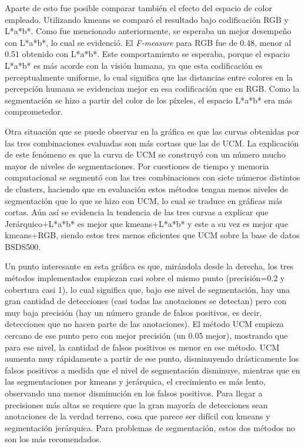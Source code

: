 \documentclass[10pt,twocolumn,letterpaper]{article}
\begin{document}
Aparte de esto fue posible comparar también el efecto del espacio de color empleado. Utilizando kmeans se comparó el resultado bajo codificación RGB y L*a*b*. Como fue mencionado anteriormente, se esperaba un mejor desempeño con L*a*b*, lo cual se evidenció. El \textit{F-measure} para RGB fue de 0.48, menor al 0.51 obtenido con L*a*b*. Este comportamiento se esperaba, porque el espacio L*a*b* es más acorde con la visión humana, ya que esta codificación es perceptualmente uniforme, lo cual significa que las distancias entre colores en la percepción humana se evidencian mejor en esa codificación que en RGB. Como la segmentación se hizo a partir del color de los píxeles, el espacio L*a*b* era más comprometedor.

Otra situación que se puede observar en la gráfica es que las curvas obtenidas por las tres combinaciones evaluadas son más cortass que las de UCM. La explicación de este fenómeno es que la curva de UCM se construyó con un número mucho mayor de niveles de segmentaciones. Por cuestiones de tiempo y memoria computacional se segmentó con las tres combinaciones con siete números distintos de clusters, haciendo que en evaluación estos métodos tengan menos niveles de segmentación que lo que se hizo con UCM, lo cual se traduce en gráficas más cortas. Aún así se evidencia la tendencia de las tres curvas a explicar que Jerárquico+L*a*b* es mejor que kmeans+L*a*b* y este a su vez es mejor que kmeans+RGB, siendo estos tres menos eficientes que UCM sobre la base de datos BSDS500. 

Un punto interesante en esta gráfica es que, mirándola desde la derecha, los tres métodos implementados empiezan casi sobre el mismo punto (precisión=0.2 y cobertura casi 1), lo cual significa que, bajo ese nivel de segmentación, hay una gran cantidad de detecciones (casi todas las anotaciones se detectan) pero con muy baja precisión (hay un número grande de falsos positivos, es decir, detecciones que no hacen parte de las anotaciones). El método UCM empieza cercano de ese punto pero con mejor precisión (un 0.05 mejor), mostrando que para ese nivel, la cantidad de falsos positivos es menor en ese método. UCM aumenta muy rápidamente a partir de ese punto, disminuyendo drásticamente los falsos positivos a medida que el nivel de segmentación disminuye, mientras que en las segmentaciones por kmeans y jerárquica, el crecimiento es más lento, observando una menor disminución en los falsos positivos. Para llegar a precisiones más altas se requiere que la gran mayoría de detecciones sean anotaciones de la verdad terreno, cosa que parece ser difícil con kmeans y segmentación jerárquica. Para problemas de segmentación, estos dos métodos no son los más recomendados.
\end{document}
